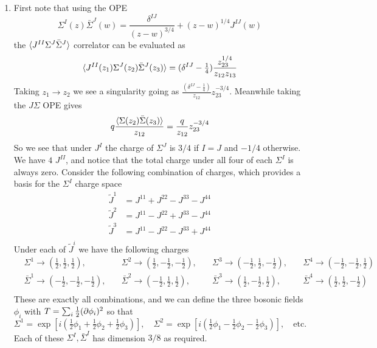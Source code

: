 \documentclass[11pt, class=article, crop=false]{standalone}
\begin{document}
\begin{enumerate}
	\item First note that using the OPE
	\[
		\Sigma^I(z) \bar \Sigma^J(w) = \frac{\delta^{IJ}}{(z-w)^{3/4}} + (z-w)^{1/4} J^{IJ}(w)
	\]
	 the $\braket{J^{II} \Sigma^J \bar \Sigma^J}$ correlator can be evaluated as
	\[
		\braket{J^{II}(z_1) \Sigma^J(z_2) \bar \Sigma^J(z_3)} =  (\delta^{IJ} - \tfrac14) \frac{z_{23}^{1/4}}{z_{12} z_{13}}
	\]
	Taking $z_1 \to z_2$ we see a singularity going as $\frac{(\delta^{IJ} - \tfrac14)}{z_{12}} z_{23}^{-3/4}$. Meanwhile taking the $J \Sigma$ OPE gives
	\[
		q \frac{\braket{\Sigma(z_2) \bar \Sigma(z_3)}}{z_{12}} = \frac{q}{z_{12}} z_{23}^{-3/4}
	\]
	So we see that under $J^I$ the charge of $\Sigma^J$ is $3/4$ if $I=J$ and $-1/4$ otherwise. We have $4$ $J^{II}$, and notice that the total charge under all four of each $\Sigma^I$ is always zero. Consider the following combination of charges, which provides a basis for the $\Sigma^I$ charge space
	\[
		\begin{aligned}
			\tilde J^1 &= J^{11} + J^{22} - J^{33} - J^{44}\\
			\tilde J^2 &= J^{11} - J^{22} + J^{33} - J^{44}\\
			\tilde J^3 &= J^{11} - J^{22} - J^{33} + J^{44}\\
		\end{aligned}
	\]
	Under each of $\tilde J^i$ we have the following charges 
	\[
	\begin{aligned}
		&\Sigma^1 \to (\tfrac12, \tfrac12, \tfrac12), \quad &\Sigma^2 \to (\tfrac12, -\tfrac12, -\tfrac12), \quad  &\Sigma^3 \to (-\tfrac12, \tfrac12, -\tfrac12), \quad &\Sigma^4 \to (-\tfrac12, -\tfrac12, \tfrac12)& \\
		&\bar \Sigma^1 \to (-\tfrac12,-\tfrac12,-\tfrac12), \quad &\bar \Sigma^2 \to (-\tfrac12, \tfrac12, \tfrac12), \quad &\bar \Sigma^3 \to (\tfrac12, -\tfrac12, \tfrac12), \quad &\bar \Sigma^4 \to (\tfrac12, \tfrac12, -\tfrac12) &\\
	\end{aligned}
	\]
	These are exactly all combinations, and we can define the three bosonic fields $\phi_i$ with $T = \sum_i \frac12(\partial \phi_i)^2$ so that
	\[
		\Sigma^1 = \exp\left[i (\tfrac12 \phi_1 + \tfrac12 \phi_2 + \tfrac12 \phi_3) \right], \quad \Sigma^2 = \exp\left[i (\tfrac12 \phi_1 - \tfrac12 \phi_2 - \tfrac12 \phi_3) \right], \quad \text{etc.}
	\]
	Each of these $\Sigma^I, \bar \Sigma^I$ has dimension $3/8$ as required.
	

\end{enumerate}
\end{document}
